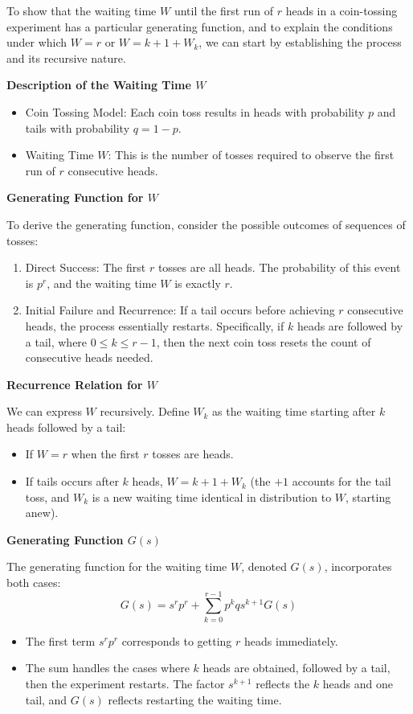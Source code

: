 \documentclass[8pt]{article}
\begin{document}
{To show that the waiting time \( W \) until the first run of \( r \) heads in a coin-tossing experiment has a particular generating function, and to explain the conditions under which \( W = r \) or \( W = k + 1 + W_k \), we can start by establishing the process and its recursive nature.

\textbf{Description of the Waiting Time \( W \)}

\begin{itemize}
    \item Coin Tossing Model: Each coin toss results in heads with probability \( p \) and tails with probability \( q = 1-p \).
    \item Waiting Time \( W \): This is the number of tosses required to observe the first run of \( r \) consecutive heads.
\end{itemize}

\textbf{Generating Function for \( W \)}

To derive the generating function, consider the possible outcomes of sequences of tosses:
\begin{enumerate}
    \item Direct Success: The first \( r \) tosses are all heads. The probability of this event is \( p^r \), and the waiting time \( W \) is exactly \( r \).
    \item Initial Failure and Recurrence: If a tail occurs before achieving \( r \) consecutive heads, the process essentially restarts. Specifically, if \( k \) heads are followed by a tail, where \( 0 \leq k \leq r-1 \), then the next coin toss resets the count of consecutive heads needed.
\end{enumerate}

\textbf{Recurrence Relation for \( W \)}

We can express \( W \) recursively. Define \( W_k \) as the waiting time starting after \( k \) heads followed by a tail:
\begin{itemize}
    \item If \( W = r \) when the first \( r \) tosses are heads.
    \item If tails occurs after \( k \) heads, \( W = k + 1 + W_k \) (the \( +1 \) accounts for the tail toss, and \( W_k \) is a new waiting time identical in distribution to \( W \), starting anew).
\end{itemize}

\textbf{Generating Function \( G(s) \)}

The generating function for the waiting time \( W \), denoted \( G(s) \), incorporates both cases:
\[ G(s) = s^r p^r + \sum_{k=0}^{r-1} p^k q s^{k+1} G(s) \]
\begin{itemize}
    \item The first term \( s^r p^r \) corresponds to getting \( r \) heads immediately.
    \item The sum handles the cases where \( k \) heads are obtained, followed by a tail, then the experiment restarts. The factor \( s^{k+1} \) reflects the \( k \) heads and one tail, and \( G(s) \) reflects restarting the waiting time.
\end{itemize}

}
\end{document}
